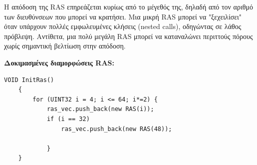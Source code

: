 \documentclass{article}
\begin{document}
Η απόδοση της RAS επηρεάζεται κυρίως από το μέγεθός της, δηλαδή από τον αριθμό των διευθύνσεων που μπορεί να κρατήσει. Μια μικρή RAS μπορεί να "ξεχειλίσει" όταν υπάρχουν πολλές εμφωλευμένες κλήσεις (nested calls), οδηγώντας σε λάθος πρόβλεψη. Αντίθετα, μια πολύ μεγάλη RAS μπορεί να καταναλώνει περιττούς πόρους χωρίς σημαντική βελτίωση στην απόδοση.

\vspace{0.3cm} \textbf{Δοκιμασμένες διαμορφώσεις RAS:}

\begin{lstlisting}[style=cppstyle]
    VOID InitRas()
    {
        for (UINT32 i = 4; i <= 64; i*=2) {
            ras_vec.push_back(new RAS(i));
            if (i == 32)
                ras_vec.push_back(new RAS(48));
    
            }
    }
\end{lstlisting}
\end{document}
